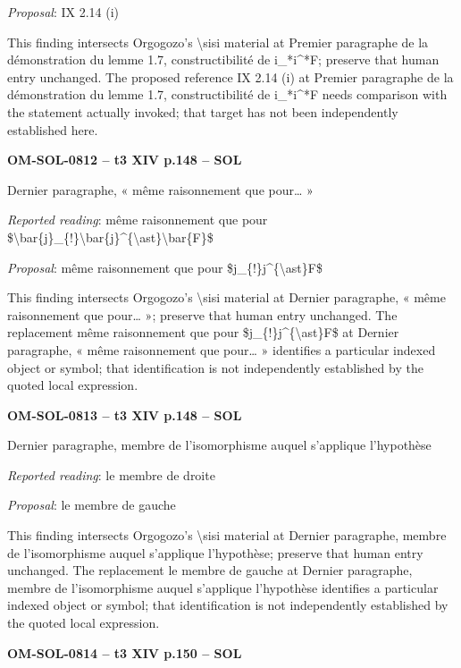 \emph{Proposal}: IX 2.14 (i)\par
This finding intersects Orgogozo's \textbackslash{}sisi material at Premier paragraphe de la démonstration du lemme 1.7, constructibilité de i\_*i\textasciicircum{}*F; preserve that human entry unchanged. The proposed reference IX 2.14 (i) at Premier paragraphe de la démonstration du lemme 1.7, constructibilité de i\_*i\textasciicircum{}*F needs comparison with the statement actually invoked; that target has not been independently established here.\par
\par\noindent\textbf{OM-SOL-0812 -- t3 XIV p.148 -- SOL}\par
Dernier paragraphe, « même raisonnement que pour… »\par
\emph{Reported reading}: même raisonnement que pour \$\textbackslash{}bar\{j\}\_\{!\}\textbackslash{}bar\{j\}\textasciicircum{}\{\textbackslash{}ast\}\textbackslash{}bar\{F\}\$\par
\emph{Proposal}: même raisonnement que pour \$j\_\{!\}j\textasciicircum{}\{\textbackslash{}ast\}F\$\par
This finding intersects Orgogozo's \textbackslash{}sisi material at Dernier paragraphe, « même raisonnement que pour… »; preserve that human entry unchanged. The replacement même raisonnement que pour \$j\_\{!\}j\textasciicircum{}\{\textbackslash{}ast\}F\$ at Dernier paragraphe, « même raisonnement que pour… » identifies a particular indexed object or symbol; that identification is not independently established by the quoted local expression.\par
\par\noindent\textbf{OM-SOL-0813 -- t3 XIV p.148 -- SOL}\par
Dernier paragraphe, membre de l'isomorphisme auquel s'applique l'hypothèse\par
\emph{Reported reading}: le membre de droite\par
\emph{Proposal}: le membre de gauche\par
This finding intersects Orgogozo's \textbackslash{}sisi material at Dernier paragraphe, membre de l'isomorphisme auquel s'applique l'hypothèse; preserve that human entry unchanged. The replacement le membre de gauche at Dernier paragraphe, membre de l'isomorphisme auquel s'applique l'hypothèse identifies a particular indexed object or symbol; that identification is not independently established by the quoted local expression.\par
\par\noindent\textbf{OM-SOL-0814 -- t3 XIV p.150 -- SOL}\par
